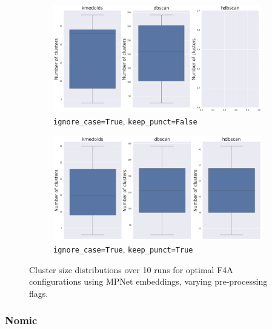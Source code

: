 \documentclass[10pt,oneside]{report}
\begin{document}
\begin{figure}[H]
    \ContinuedFloat
    \centering
    \begin{subfigure}[b]{\textwidth}
        \centering
        \includegraphics[width=\textwidth]{./images/mpnet_true-false_whisker.png}
        \caption{\texttt{ignore\_case=True}, \texttt{keep\_punct=False}} \label{fig:mpnet_tf_f4a_whisker}
    \end{subfigure}
    \hfill
    \begin{subfigure}[b]{\textwidth}
        \centering
        \includegraphics[width=\textwidth]{./images/mpnet_true-true_whisker.png}
        \caption{\texttt{ignore\_case=True}, \texttt{keep\_punct=True}} \label{fig:mpnet_tt_f4a_whisker}
    \end{subfigure}
    \caption{Cluster size distributions over 10 runs for optimal F4A configurations using MPNet embeddings, varying pre-processing flags.}
    \label{fig:mpnet_f4a_whisker_appendix}
\end{figure}

\subsubsection{Nomic}
\end{document}
